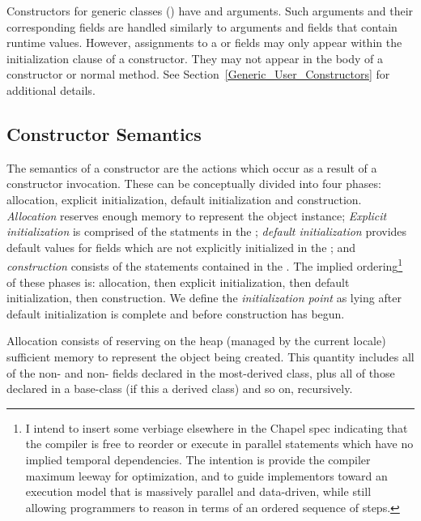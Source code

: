 Constructors for generic classes () have 
and  arguments.  Such arguments and their corresponding fields are
handled similarly to arguments and fields that contain runtime values.  However,
assignments to a  or  fields may only appear within the
initialization clause of a constructor.  They may not appear in the body of a
constructor or normal method.
See Section~\ref{Generic_User_Constructors} for additional
details.  

\subsection{Constructor Semantics}
\label{Constructor_Semantics}

The semantics of a constructor are the actions which occur as a result of a
constructor invocation.  These can be conceptually divided
into four phases: allocation, explicit initialization,
default initialization and
construction.  \emph{Allocation} reserves enough memory to represent the object
instance; \emph{Explicit initialization} is comprised of the statments in
the ; \emph{default initialization} provides
default values for fields which are not explicitly initialized in
the ; and \emph{construction} consists of the
statements contained in the .  
The implied ordering\footnote{I intend to insert some verbiage elsewhere in the
Chapel spec indicating that the compiler is free to reorder or execute in
parallel statements which have no implied temporal dependencies.  The intention
is provide the compiler maximum leeway for optimization, and to guide
implementors toward an execution model that is massively parallel and
data-driven, while still allowing programmers to reason in terms of an ordered
sequence of steps.} of these phases is: allocation, then explicit
initialization, then default initialization, then construction.  We define the
\emph{initialization point} as lying after default initialization is complete and
before construction has begun.

Allocation consists of reserving on the heap (managed by the current locale)
sufficient memory to represent the object being created.  This quantity includes
all of the non- and non- fields declared in the
most-derived class, plus all of those declared in a base-class (if this
a derived class) and so on, recursively.


